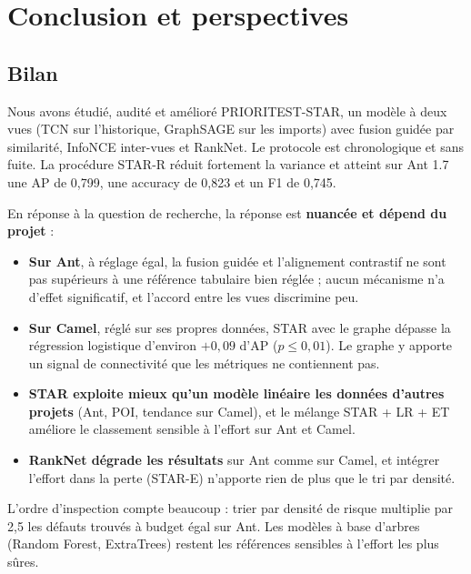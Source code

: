 \documentclass[11pt,a4paper,openany]{report}
\begin{document}
\chapter{Conclusion et perspectives}

\section{Bilan}
Nous avons étudié, audité et amélioré PRIORITEST-STAR, un modèle à deux vues (TCN sur l'historique, GraphSAGE sur
les imports) avec fusion guidée par similarité, InfoNCE inter-vues et RankNet. Le protocole est chronologique et sans
fuite. La procédure STAR-R réduit fortement la variance et atteint sur Ant 1.7 une AP de 0,799, une accuracy de
0,823 et un F1 de 0,745.

En réponse à la question de recherche, la réponse est \textbf{nuancée et dépend du projet} :
\begin{itemize}
  \item \textbf{Sur Ant}, à réglage égal, la fusion guidée et l'alignement contrastif ne sont pas supérieurs à une
        référence tabulaire bien réglée ; aucun mécanisme n'a d'effet significatif, et l'accord entre les vues
        discrimine peu.
  \item \textbf{Sur Camel}, réglé sur ses propres données, STAR avec le graphe dépasse la régression logistique
        d'environ $+0{,}09$ d'AP ($p\le0{,}01$). Le graphe y apporte un signal de connectivité que les métriques ne
        contiennent pas.
  \item \textbf{STAR exploite mieux qu'un modèle linéaire les données d'autres projets} (Ant, POI, tendance sur Camel),
        et le mélange STAR + LR + ET améliore le classement sensible à l'effort sur Ant et Camel.
  \item \textbf{RankNet dégrade les résultats} sur Ant comme sur Camel, et intégrer l'effort dans la perte (STAR-E)
        n'apporte rien de plus que le tri par densité.
\end{itemize}
L'ordre d'inspection compte beaucoup : trier par densité de risque multiplie par 2,5 les défauts trouvés à budget égal
sur Ant. Les modèles à base d'arbres (Random Forest, ExtraTrees) restent les références sensibles à l'effort les plus
sûres.
\end{document}
